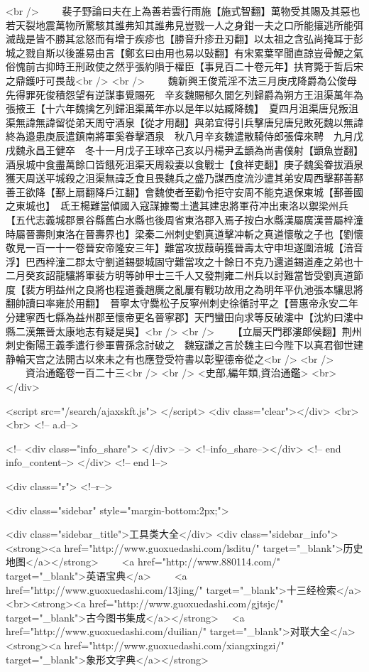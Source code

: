 <br />
　　裴子野論曰夫在上為善若雲行雨施【施式智翻】萬物受其賜及其惡也若天裂地震萬物所驚駭其誰弗知其誰弗見豈戮一人之身鉗一夫之口所能攘逃所能弭滅哉是皆不勝其忿怒而有增于疾疹也【勝音升疹丑刃翻】以太祖之含弘尚掩耳于彭城之戮自斯以後誰易由言【鄭玄曰由用也易以䜴翻】有宋累葉罕聞直諒豈骨鯁之氣俗愧前古抑時王刑政使之然乎張約隕于權臣【事見百二十卷元年】扶育斃于哲后宋之鼎鑊吁可畏哉<br />
<br />
　　魏新興王俊荒淫不法三月庚戌降爵為公俊母先得罪死俊積怨望有逆謀事覺賜死　辛亥魏賜郁久閭乞列歸爵為朔方王沮渠萬年為張掖王【十六年魏擒乞列歸沮渠萬年亦以是年以姑臧降魏】　夏四月沮渠唐兒叛沮渠無諱無諱留從弟天周守酒泉【從才用翻】與弟宜得引兵擊唐兒唐兒敗死魏以無諱終為邉患庚辰遣鎮南將軍奚眷擊酒泉　秋八月辛亥魏遣散騎侍郎張偉來聘　九月戊戌魏永昌王健卒　冬十一月戊子王球卒己亥以丹楊尹孟顗為尚書僕射【顗魚豈翻】　酒泉城中食盡萬餘口皆餓死沮渠天周殺妻以食戰士【食祥吏翻】庚子魏奚眷拔酒泉獲天周送平城殺之沮渠無諱乏食且畏魏兵之盛乃謀西度流沙遣其弟安周西擊鄯善鄯善王欲降【鄯上扇翻降戶江翻】會魏使者至勸令拒守安周不能克退保東城【鄯善國之東城也】　氐王楊難當傾國入寇謀據蜀土遣其建忠將軍苻冲出東洛以禦梁州兵【五代志義城郡景谷縣舊白水縣也後周省東洛郡入焉子按白水縣漢屬廣漢晉屬梓潼時屬晉壽則東洛在晉壽界也】梁秦二州刺史劉真道擊冲斬之真道懷敬之子也【劉懷敬見一百一十一卷晉安帝隆安三年】難當攻拔葭萌獲晉壽太守申坦遂圍涪城【涪音浮】巴西梓潼二郡太守劉道錫嬰城固守難當攻之十餘日不克乃還道錫道產之弟也十二月癸亥詔龍驤將軍裴方明等帥甲士三千人又發荆雍二州兵以討難當皆受劉真道節度【裴方明益州之良將也程道養趙廣之亂屢有戰功故用之為明年平仇池張本驤思將翻帥讀曰率雍於用翻】　晉寧太守爨松子反寧州刺史徐循討平之【晉惠帝永安二年分建寧西七縣為益州郡至懷帝更名晉寧郡】天門蠻田向求等反破漊中【沈約曰漊中縣二漢無晉太康地志有疑是吳】<br />
<br />
　　【立屬天門郡漊郎侯翻】荆州刺史衡陽王義季遣行參軍曹孫念討破之　魏寇謙之言於魏主曰今陛下以真君御世建静輪天宫之法開古以來未之有也應登受符書以彰聖德帝從之<br />
<br />
　　資治通鑑卷一百二十三<br />
<br />
<史部,編年類,資治通鑑>  <br>
   </div> 

<script src="/search/ajaxskft.js"> </script>
 <div class="clear"></div>
<br>
<br>
 <!-- a.d-->

 <!--
<div class="info_share">
</div> 
-->
 <!--info_share--></div>   <!-- end info_content-->
  </div> <!-- end l-->

<div class="r">   <!--r-->



<div class="sidebar"  style="margin-bottom:2px;">

 
<div class="sidebar_title">工具类大全</div>
<div class="sidebar_info">
<strong><a href="http://www.guoxuedashi.com/lsditu/" target="_blank">历史地图</a></strong>　　
<a href="http://www.880114.com/" target="_blank">英语宝典</a>　　
<a href="http://www.guoxuedashi.com/13jing/" target="_blank">十三经检索</a>　
<br><strong><a href="http://www.guoxuedashi.com/gjtsjc/" target="_blank">古今图书集成</a></strong>　
<a href="http://www.guoxuedashi.com/duilian/" target="_blank">对联大全</a>　<strong><a href="http://www.guoxuedashi.com/xiangxingzi/" target="_blank">象形文字典</a></strong>　

